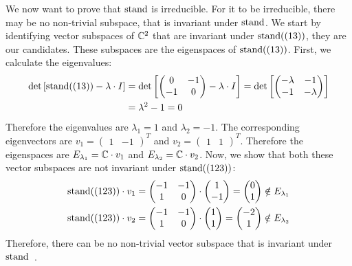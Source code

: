 We now want to prove that $\operatorname{stand}$ is irreducible.
For it to be irreducible, there may be no non-trivial subspace, that is invariant under $\operatorname{stand}$.
We start by identifying vector subspaces of $\mathbb{C}^2$ that are invariant under $\operatorname{stand}((13))$, they are our candidates.
These subspaces are the eigenspaces of $\operatorname{stand}((13))$.
First, we calculate the eigenvalues:
\begin{subequations}
\begin{align}
    \det \left[ \operatorname{stand}((13)) - \lambda \cdot I \right]
    & = \det \left[ \begin{pmatrix}
        0 & -1 \\ -1 & 0
    \end{pmatrix} - \lambda \cdot I \right] = \det \left[ \begin{pmatrix}
        -\lambda & -1 \\ -1 & -\lambda
    \end{pmatrix} \right] \\
    & = \lambda^2 - 1 = 0
\end{align}
\end{subequations}
Therefore the eigenvalues are $\lambda_1 = 1$ and $\lambda_2 = -1$.
The corresponding eigenvectors are $v_1 = \begin{pmatrix}
    1 & -1
\end{pmatrix}^T$ and $v_2 = \begin{pmatrix}
    1 & 1
\end{pmatrix}^T$.
Therefore the eigenspaces are $E_{\lambda_1} = \mathbb{C} \cdot v_1$ and $E_{\lambda_2} = \mathbb{C} \cdot v_2$.
Now, we show that both these vector subspaces are not invariant under $\operatorname{stand}((123))$:
\begin{subequations}
\begin{align}
    \operatorname{stand}((123)) \cdot v_1 & = \begin{pmatrix}
        -1 & -1 \\
        1 & 0
    \end{pmatrix} \cdot \begin{pmatrix}
        1 \\ -1
    \end{pmatrix} = \begin{pmatrix}
        0 \\ 1
    \end{pmatrix} \notin E_{\lambda_1} \\
    \operatorname{stand}((123)) \cdot v_2 & = \begin{pmatrix}
        -1 & -1 \\
        1 & 0
    \end{pmatrix} \cdot \begin{pmatrix}
        1 \\ 1
    \end{pmatrix} = \begin{pmatrix}
        -2 \\ 1
    \end{pmatrix} \notin E_{\lambda_2}
\end{align}
\end{subequations}
Therefore, there can be no non-trivial vector subspace that is invariant under $\operatorname{stand}$~\cite{fulton2013}.

